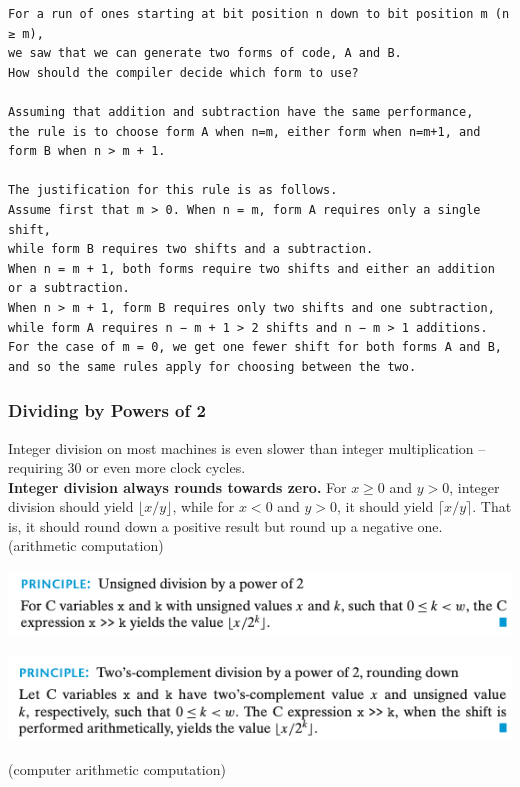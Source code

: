 \documentclass[11pt]{article}
\begin{document}
\begin{verbatim}
For a run of ones starting at bit position n down to bit position m (n ≥ m), 
we saw that we can generate two forms of code, A and B. 
How should the compiler decide which form to use?

Assuming that addition and subtraction have the same performance, 
the rule is to choose form A when n=m, either form when n=m+1, and form B when n > m + 1.

The justification for this rule is as follows. 
Assume first that m > 0. When n = m, form A requires only a single shift, 
while form B requires two shifts and a subtraction. 
When n = m + 1, both forms require two shifts and either an addition or a subtraction. 
When n > m + 1, form B requires only two shifts and one subtraction, 
while form A requires n − m + 1 > 2 shifts and n − m > 1 additions. 
For the case of m = 0, we get one fewer shift for both forms A and B, 
and so the same rules apply for choosing between the two.
\end{verbatim}

\subsubsection{Dividing by Powers of 2}
\label{sec:org4e8a099}
Integer division on most machines is even slower than integer multiplication -- requiring 30 or even more clock cycles.\\

\textbf{Integer division always rounds towards zero.} For \(x \ge 0\) and \(y>0\), integer division should yield \(\lfloor x/y \rfloor\), while for \(x<0\) and \(y>0\), it should yield \(\lceil x/y \rceil\). That is, it should round down a positive result but round up a negative one. (arithmetic computation)\\

\begin{center}
\includegraphics[width=.9\linewidth]{pics/unsigned-division-by-a-power-of-2.png}
\end{center}


\begin{center}
\includegraphics[width=.9\linewidth]{pics/two's-complement-division-by-a-power-of-2-rounding-down.png}
\end{center}
(computer arithmetic computation)\\
\end{document}
